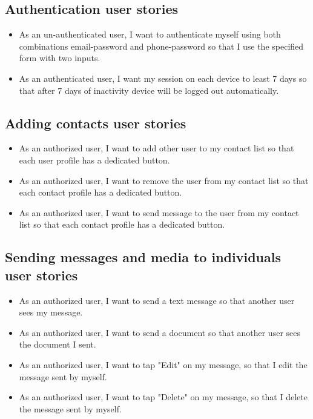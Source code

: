 \subsection{Authentication user stories}\label{subsec:authentication-user-stories}
\begin{itemize}
    \item As an un-authenticated user, I want to authenticate myself using both combinations email-password
    and phone-password so that I use the specified form with two inputs.
    \item As an authenticated user, I want my session on each device to least 7 days
    so that after 7 days of inactivity device will be logged out automatically.
\end{itemize}

\subsection{Adding contacts user stories}\label{subsec:adding-contacts}
\begin{itemize}
    \item As an authorized user, I want to add other user to my contact list so that each user profile has a dedicated button.
    \item As an authorized user, I want to remove the user from my contact list so that each contact profile has a dedicated button.
    \item As an authorized user, I want to send message to the user from my contact list so that each contact profile has a dedicated button.
\end{itemize}

\subsection{Sending messages and media to individuals user stories}
\label{subsec:sending-messages-and-media-feature-user-stories}
\begin{itemize}
    \item As an authorized user, I want to send a text message so that another user sees my message.
    \item As an authorized user, I want to send a document so that another user sees the document I sent.
    \item As an authorized user, I want to tap "Edit" on my message, so that I edit the message sent by myself.
    \item As an authorized user, I want to tap "Delete" on my message, so that I delete the message sent by myself.
\end{itemize}

